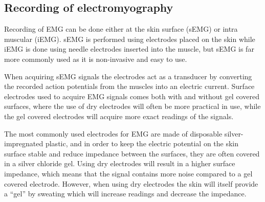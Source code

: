 \subsection{Recording of electromyography}

Recording of EMG can be done either at the skin surface (sEMG) or intra muscular (iEMG). sEMG is performed using electrodes placed on the skin while iEMG is done using needle electrodes inserted into the muscle, but sEMG is far more commonly used as it is non-invasive and easy to use. \cite{cram2012}  

When acquiring sEMG signals the electrodes act as a transducer by converting the recorded action potentials from the muscles into an electric current. Surface electrodes used to acquire EMG signals comes both with and without gel covered surfaces, where the use of dry electrodes will often be more practical in use, while the gel covered electrodes will acquire more exact readings of the signals. \cite{lee2008, cram2012}

The most commonly used electrodes for EMG are made of disposable silver-impregnated plastic, and in order to keep the electric potential on the skin surface stable and reduce impedance between the surfaces, they are often covered in a silver chloride gel. Using dry electrodes will result in a higher surface impedance, which means that the signal contains more noise compared to a gel covered electrode. However, when using dry electrodes the skin will itself provide a “gel” by sweating which will increase readings and decrease the impedance. \cite{cram2012}



